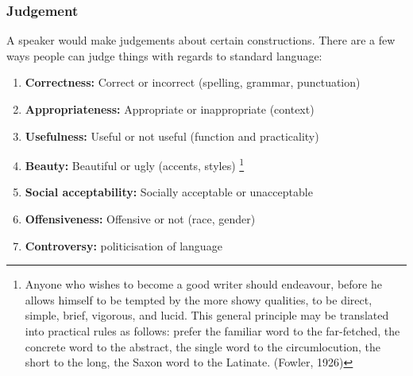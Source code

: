 \documentclass[../main.tex]{subfiles}
\begin{document}
        \subsubsection{Judgement}
        A speaker would make judgements about certain constructions. There are a few ways people can judge things with regards to standard language:
        \begin{enumerate}
            \item \textbf{Correctness:} Correct or incorrect (spelling, grammar, punctuation)
            \item \textbf{Appropriateness:} Appropriate or inappropriate (context)
            \item \textbf{Usefulness:} Useful or not useful (function and practicality)
            \item \textbf{Beauty:} Beautiful or ugly (accents, styles) \footnote{Anyone who wishes to become a good writer should endeavour, before he allows himself to be tempted by the more showy qualities, to be direct, simple, brief, vigorous, and lucid. This general principle may be translated into practical rules as follows: prefer the familiar word to the far-fetched, the concrete word to the abstract, the single word to the circumlocution, the short to the long, the Saxon word to the Latinate. (Fowler, 1926)}
            \item \textbf{Social acceptability:} Socially acceptable or unacceptable
            \item \textbf{Offensiveness:} Offensive or not (race, gender)
            \item \textbf{Controversy:} politicisation of language
        \end{enumerate}


\end{document}
